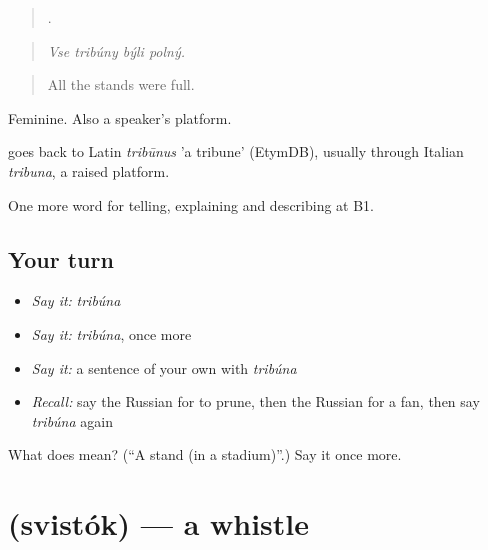\begin{quote}
   .
\end{quote}

\begin{quote}
\emph{Vse tribúny býli polný.}
\end{quote}

\begin{quote}
All the stands were full.
\end{quote}

Feminine. Also a speaker's platform.

\begin{cousinweb}
\emph{} goes back to Latin \emph{tribūnus} 'a tribune' (EtymDB), usually through Italian \emph{tribuna}, a raised platform.
\end{cousinweb}

\begin{grammarlens}[title={What you've built}]
One more word for telling, explaining and describing at B1.
\end{grammarlens}

\subsection*{Your turn}
\begin{itemize}
\raggedright
  \item \emph{Say it:} \emph{tribúna}
  \item \emph{Say it:} \emph{tribúna}, once more
  \item \emph{Say it:} a sentence of your own with \emph{tribúna}
  \item \emph{Recall:} say the Russian for to prune, then the Russian for a fan, then say \emph{tribúna} again
\end{itemize}

\begin{tcolorbox}[breakable,colback=teal!4,colframe=teal!35!black,title={Before you move on}]
What does  mean? (\textquotedblleft{}A stand (in a stadium)\textquotedblright{}.) Say it once more.
\end{tcolorbox}
\section[\texorpdfstring{\ru{свисток} (svistók)}{свисток (svistók)}]{ (svistók) — a whistle}

\label{lesson:RU-C508-svistok}




